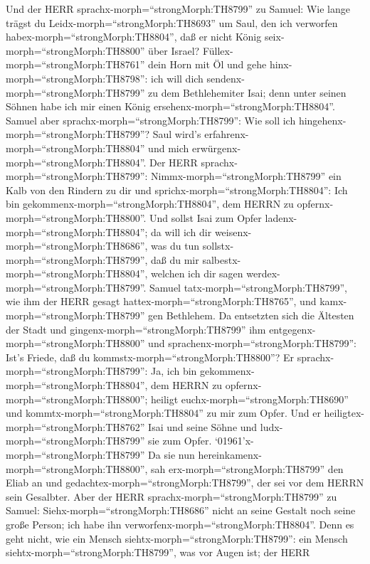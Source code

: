  Und der HERR sprachx-morph=``strongMorph:TH8799'' zu
Samuel: Wie lange trägst du Leidx-morph=``strongMorph:TH8693'' um Saul,
den ich verworfen habex-morph=``strongMorph:TH8804'', daß er nicht König
seix-morph=``strongMorph:TH8800'' über Israel?
Füllex-morph=``strongMorph:TH8761'' dein Horn mit Öl und gehe
hinx-morph=``strongMorph:TH8798'': ich will dich
sendenx-morph=``strongMorph:TH8799'' zu dem Bethlehemiter Isai; denn
unter seinen Söhnen habe ich mir einen König
ersehenx-morph=``strongMorph:TH8804''.  Samuel aber
sprachx-morph=``strongMorph:TH8799'': Wie soll ich
hingehenx-morph=``strongMorph:TH8799''? Saul wird's
erfahrenx-morph=``strongMorph:TH8804'' und mich
erwürgenx-morph=``strongMorph:TH8804''. Der HERR
sprachx-morph=``strongMorph:TH8799'': Nimmx-morph=``strongMorph:TH8799''
ein Kalb von den Rindern zu dir und
sprichx-morph=``strongMorph:TH8804'': Ich bin
gekommenx-morph=``strongMorph:TH8804'', dem HERRN zu
opfernx-morph=``strongMorph:TH8800''.  Und sollst Isai zum
Opfer ladenx-morph=``strongMorph:TH8804''; da will ich dir
weisenx-morph=``strongMorph:TH8686'', was du tun
sollstx-morph=``strongMorph:TH8799'', daß du mir
salbestx-morph=``strongMorph:TH8804'', welchen ich dir sagen
werdex-morph=``strongMorph:TH8799''.  Samuel
tatx-morph=``strongMorph:TH8799'', wie ihm der HERR gesagt
hattex-morph=``strongMorph:TH8765'', und
kamx-morph=``strongMorph:TH8799'' gen Bethlehem. Da entsetzten sich die
Ältesten der Stadt und gingenx-morph=``strongMorph:TH8799'' ihm
entgegenx-morph=``strongMorph:TH8800'' und
sprachenx-morph=``strongMorph:TH8799'': Ist's Friede, daß du
kommstx-morph=``strongMorph:TH8800''?  Er
sprachx-morph=``strongMorph:TH8799'': Ja, ich bin
gekommenx-morph=``strongMorph:TH8804'', dem HERRN zu
opfernx-morph=``strongMorph:TH8800''; heiligt
euchx-morph=``strongMorph:TH8690'' und
kommtx-morph=``strongMorph:TH8804'' zu mir zum Opfer. Und er
heiligtex-morph=``strongMorph:TH8762'' Isai und seine Söhne und
ludx-morph=``strongMorph:TH8799'' sie zum Opfer. 
`01961'\textbar x-morph=``strongMorph:TH8799'' Da sie nun
hereinkamenx-morph=``strongMorph:TH8800'', sah
erx-morph=``strongMorph:TH8799'' den Eliab an und
gedachtex-morph=``strongMorph:TH8799'', der sei vor dem HERRN sein
Gesalbter.  Aber der HERR
sprachx-morph=``strongMorph:TH8799'' zu Samuel:
Siehx-morph=``strongMorph:TH8686'' nicht an seine Gestalt noch seine
große Person; ich habe ihn verworfenx-morph=``strongMorph:TH8804''. Denn
es geht nicht, wie ein Mensch siehtx-morph=``strongMorph:TH8799'': ein
Mensch siehtx-morph=``strongMorph:TH8799'', was vor Augen ist; der HERR
